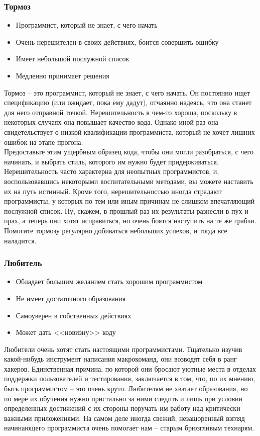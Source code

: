 \documentclass{../industrial-development}
\begin{document}
\begin{frame} \frametitle{Тормоз}
	\begin{itemize}
		\item Программист, который не знает, с чего начать
		\item Очень нерешителен в своих действиях, боится совершить ошибку
		\item Имеет небольшой послужной список
		\item Медленно принимает решения
	\end{itemize}
\end{frame}
\lecturenotes
Тормоз – это программист, который не знает, с чего начать. Он постоянно ищет спецификацию (или ожидает, пока ему дадут), отчаянно надеясь, что она станет для него отправной точкой. Нерешительность в чем-то хороша, поскольку в некоторых случаях она повышает качество кода. Однако иной раз она свидетельствует о низкой квалификации программиста, который не хочет лишних ошибок на этапе прогона.  \\ 
Предоставьте этим ущербным образец кода, чтобы они могли разобраться, с чего начинать, и выбрать стиль, которого им нужно будет придерживаться. Нерешительность часто характерна для неопытных программистов, и, воспользовавшись некоторыми воспитательными методами, вы можете наставить их на путь истинный. Кроме того, нерешительностью иногда страдают программисты, у которых по тем или иным причинам не слишком впечатляющий послужной список. Ну, скажем, в прошлый раз их результаты разнесли в пух и прах, а теперь они хотят исправиться, но очень боятся наступить на те же грабли. Помогите тормозу регулярно добиваться небольших успехов, и тогда все наладится. 

\begin{frame} \frametitle{Любитель}
	\begin{itemize}
		\item Обладает большим желанием стать хорошим программистом
		\item Не имеет достаточного образования
		\item Самоуверен в собственных действиях
		\item Может дать <<новизну>> коду
	\end{itemize}
\end{frame}
\lecturenotes
Любители очень хотят стать настоящими программистами. Тщательно изучив какой-нибудь инструмент написания макрокоманд, они возводят себя в ранг хакеров. Единственная причина, по которой они бросают уютные места в отделах поддержки пользователей и тестирования, заключается в том, что, по их мнению, быть программистом – это очень круто. 
Любителям не хватает образования, но по мере их обучения нужно пристально за ними следить и лишь при условии определенных достижений с их стороны поручать им работу над критически важными приложениями. На самом деле иногда свежий, незашоренный взгляд начинающего программиста очень помогает нам – старым брюзгливым технарям.
\end{document}
